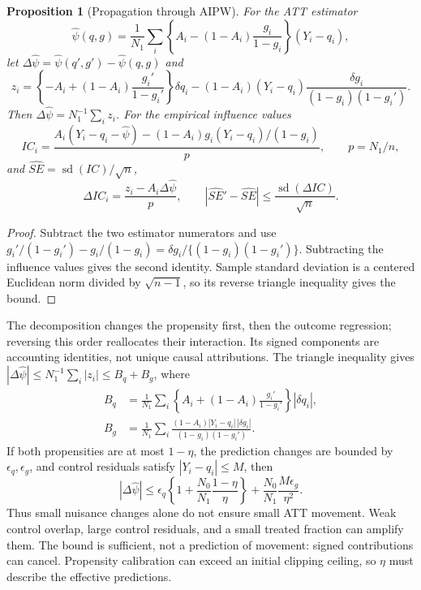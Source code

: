 \documentclass[11pt]{article}
\newtheorem{proposition}{Proposition}
\theoremstyle{definition}
\theoremstyle{remark}
\begin{document}
\begin{proposition}[Propagation through AIPW]\label{prop:aipw-change}
For the ATT estimator
\[
 \widehat\psi(q,g)=\frac{1}{N_1}\sum_i
 \left\{A_i-(1-A_i)\frac{g_i}{1-g_i}\right\}(Y_i-q_i),
\]
let $\Delta\widehat\psi=\widehat\psi(q',g')-\widehat\psi(q,g)$ and
\begin{equation}\label{eq:aipw-change}
 z_i=\left\{-A_i+(1-A_i)\frac{g_i'}{1-g_i'}\right\}\delta q_i
 -(1-A_i)(Y_i-q_i)
       \frac{\delta g_i}{(1-g_i)(1-g_i')}.
\end{equation}
Then $\Delta\widehat\psi=N_1^{-1}\sum_i z_i$. For the empirical influence
values
\[
 IC_i=\frac{A_i(Y_i-q_i-\widehat\psi)
 -(1-A_i)g_i(Y_i-q_i)/(1-g_i)}{p},\qquad p=N_1/n,
\]
and $\widehat{SE}=\operatorname{sd}(IC)/\sqrt n$,
\begin{equation}\label{eq:aipw-se-change}
 \Delta IC_i=\frac{z_i-A_i\Delta\widehat\psi}{p},\qquad
 |\widehat{SE}'-\widehat{SE}|
 \le\frac{\operatorname{sd}(\Delta IC)}{\sqrt n}.
\end{equation}
\end{proposition}
\begin{proof}
Subtract the two estimator numerators and use
$g_i'/(1-g_i')-g_i/(1-g_i)
=\delta g_i/\{(1-g_i)(1-g_i')\}$.
Subtracting the influence values gives the second identity. Sample standard
deviation is a centered Euclidean norm divided by $\sqrt{n-1}$, so its reverse
triangle inequality gives the bound.
\end{proof}

The decomposition changes the propensity first, then the outcome regression;
reversing this order reallocates their interaction. Its signed components
are accounting identities, not unique causal attributions. The triangle
inequality gives
$|\Delta\widehat\psi|\le N_1^{-1}\sum_i|z_i|\le B_q+B_g$, where
\begin{align*}
 B_q&=\frac{1}{N_1}\sum_i
 \left\{A_i+(1-A_i)\frac{g_i'}{1-g_i'}\right\}|\delta q_i|,\\
 B_g&=\frac{1}{N_1}\sum_i
 \frac{(1-A_i)|Y_i-q_i|\,|\delta g_i|}{(1-g_i)(1-g_i')}.
\end{align*}
If both propensities are at most $1-\eta$, the prediction changes are bounded
by $\epsilon_q,\epsilon_g$, and control residuals satisfy $|Y_i-q_i|\le M$,
then
\begin{equation}\label{eq:aipw-overlap-bound}
 |\Delta\widehat\psi|\le
 \epsilon_q\left\{1+\frac{N_0}{N_1}\frac{1-\eta}{\eta}\right\}
 +\frac{N_0}{N_1}\frac{M\epsilon_g}{\eta^2}.
\end{equation}
Thus small nuisance changes alone do not ensure small ATT movement. Weak
control overlap, large control residuals, and a small treated fraction can
amplify them. The bound is sufficient, not a prediction of movement: signed
contributions can cancel. Propensity calibration can exceed an initial
clipping ceiling, so $\eta$ must describe the effective predictions.
\end{document}
